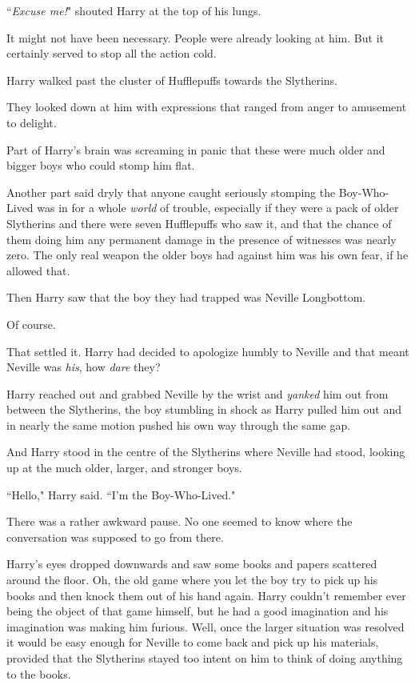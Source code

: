 ``\emph{Excuse me!}" shouted Harry at the top of his lungs.

It might not have been necessary. People were already looking at him. But it certainly served to stop all the action cold.

Harry walked past the cluster of Hufflepuffs towards the Slytherins.

They looked down at him with expressions that ranged from anger to amusement to delight.

Part of Harry's brain was screaming in panic that these were much older and bigger boys who could stomp him flat.

Another part said dryly that anyone caught seriously stomping the Boy-Who-Lived was in for a whole \emph{world} of trouble, especially if they were a pack of older Slytherins and there were seven Hufflepuffs who saw it, and that the chance of them doing him any permanent damage in the presence of witnesses was nearly zero. The only real weapon the older boys had against him was his own fear, if he allowed that.

Then Harry saw that the boy they had trapped was Neville Longbottom.

Of course.

That settled it. Harry had decided to apologize humbly to Neville and that meant Neville was \emph{his}, how \emph{dare} they?

Harry reached out and grabbed Neville by the wrist and \emph{yanked} him out from between the Slytherins, the boy stumbling in shock as Harry pulled him out and in nearly the same motion pushed his own way through the same gap.

And Harry stood in the centre of the Slytherins where Neville had stood, looking up at the much older, larger, and stronger boys.

``Hello," Harry said. ``I'm the Boy-Who-Lived."

There was a rather awkward pause. No one seemed to know where the conversation was supposed to go from there.

Harry's eyes dropped downwards and saw some books and papers scattered around the floor. Oh, the old game where you let the boy try to pick up his books and then knock them out of his hand again. Harry couldn't remember ever being the object of that game himself, but he had a good imagination and his imagination was making him furious. Well, once the larger situation was resolved it would be easy enough for Neville to come back and pick up his materials, provided that the Slytherins stayed too intent on him to think of doing anything to the books.

